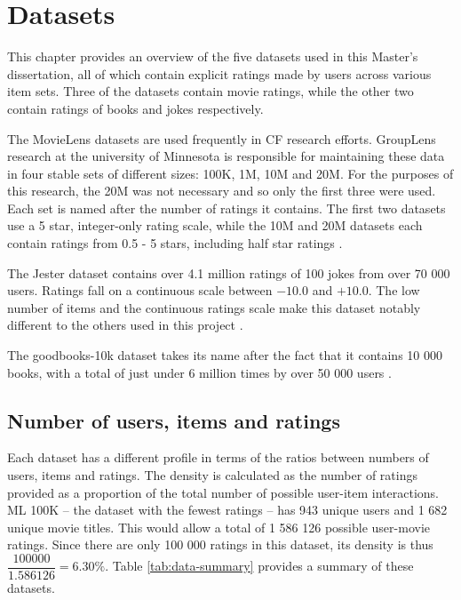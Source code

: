 \chapter{Datasets}
This chapter provides an overview of the five datasets used in this Master's dissertation, all of which contain explicit ratings made by users across various item sets. Three of the datasets contain movie ratings, while the other two contain ratings of books and jokes respectively.

The MovieLens datasets are used frequently in CF research efforts. GroupLens research at the university of Minnesota is responsible for maintaining these data in four stable sets of different sizes: 100K, 1M, 10M and 20M. For the purposes of this research, the 20M was not necessary and so only the first three were used. Each set is named after the number of ratings it contains. The first two datasets use a 5 star, integer-only rating scale, while the 10M and 20M datasets each contain ratings from 0.5 - 5 stars, including half star ratings \parencite{harper2016movielens}.

The Jester dataset contains over 4.1 million ratings of 100 jokes from over 70 000 users. Ratings fall on a continuous scale between $-10.0$ and $+10.0$. The low number of items and the continuous ratings scale make this dataset notably different to the others used in this project \parencite{cf_1.2_eigentaste}.

The goodbooks-10k dataset takes its name after the fact that it contains 10 000 books, with a total of just under 6 million times by over 50 000 users \parencite{goodbooks2017}.

\section{Number of users, items and ratings}
Each dataset has a different profile in terms of the ratios between numbers of users, items and ratings. The density is calculated as the number of ratings provided as a proportion of the total number of possible user-item interactions. ML 100K -- the dataset with the fewest ratings -- has 943 unique users and 1 682 unique movie titles. This would allow a total of 1 586 126 possible user-movie ratings. Since there are only 100 000 ratings in this dataset, its density is thus $\dfrac{100000}{1.586126} = 6.30\%$. Table \ref{tab:data-summary} provides a summary of these datasets. 

